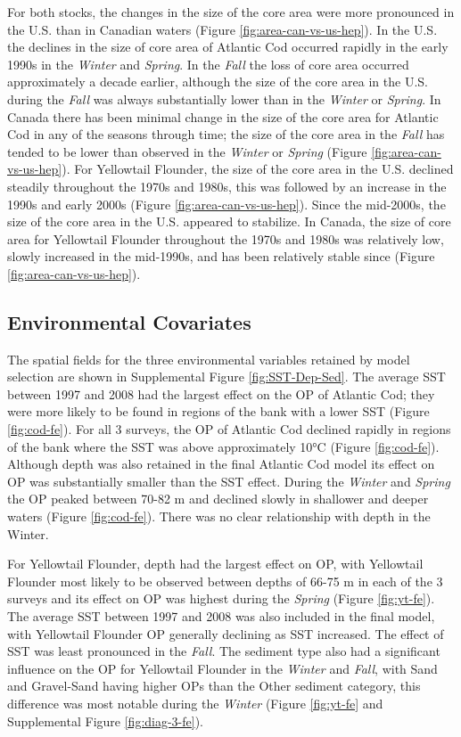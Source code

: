 \documentclass[
]{article}
\begin{document}
For both stocks, the changes in the size of the core area were more pronounced in the U.S. than in Canadian waters (Figure \ref{fig:area-can-vs-us-hep}). In the U.S. the declines in the size of core area of Atlantic Cod occurred rapidly in the early 1990s in the \emph{Winter} and \emph{Spring}. In the \emph{Fall} the loss of core area occurred approximately a decade earlier, although the size of the core area in the U.S. during the \emph{Fall} was always substantially lower than in the \emph{Winter} or \emph{Spring}. In Canada there has been minimal change in the size of the core area for Atlantic Cod in any of the seasons through time; the size of the core area in the \emph{Fall} has tended to be lower than observed in the \emph{Winter} or \emph{Spring} (Figure \ref{fig:area-can-vs-us-hep}). For Yellowtail Flounder, the size of the core area in the U.S. declined steadily throughout the 1970s and 1980s, this was followed by an increase in the 1990s and early 2000s (Figure \ref{fig:area-can-vs-us-hep}). Since the mid-2000s, the size of the core area in the U.S. appeared to stabilize. In Canada, the size of core area for Yellowtail Flounder throughout the 1970s and 1980s was relatively low, slowly increased in the mid-1990s, and has been relatively stable since (Figure \ref{fig:area-can-vs-us-hep}).

\hypertarget{environmental-covariates-1}{%
\subsection{Environmental Covariates}\label{environmental-covariates-1}}

The spatial fields for the three environmental variables retained by model selection are shown in Supplemental Figure \ref{fig:SST-Dep-Sed}. The average SST between 1997 and 2008 had the largest effect on the OP of Atlantic Cod; they were more likely to be found in regions of the bank with a lower SST (Figure \ref{fig:cod-fe}). For all 3 surveys, the OP of Atlantic Cod declined rapidly in regions of the bank where the SST was above approximately 10°C (Figure \ref{fig:cod-fe}). Although depth was also retained in the final Atlantic Cod model its effect on OP was substantially smaller than the SST effect. During the \emph{Winter} and \emph{Spring} the OP peaked between 70-82 m and declined slowly in shallower and deeper waters (Figure \ref{fig:cod-fe}). There was no clear relationship with depth in the Winter.

For Yellowtail Flounder, depth had the largest effect on OP, with Yellowtail Flounder most likely to be observed between depths of 66-75 m in each of the 3 surveys and its effect on OP was highest during the \emph{Spring} (Figure \ref{fig:yt-fe}). The average SST between 1997 and 2008 was also included in the final model, with Yellowtail Flounder OP generally declining as SST increased. The effect of SST was least pronounced in the \emph{Fall}. The sediment type also had a significant influence on the OP for Yellowtail Flounder in the \emph{Winter} and \emph{Fall}, with Sand and Gravel-Sand having higher OPs than the Other sediment category, this difference was most notable during the \emph{Winter} (Figure \ref{fig:yt-fe} and Supplemental Figure \ref{fig:diag-3-fe}).
\end{document}
